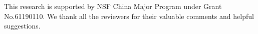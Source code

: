This research is supported by NSF China Major Program under Grant No.61190110. 
We thank all the reviewers for their valuable comments and helpful suggestions.